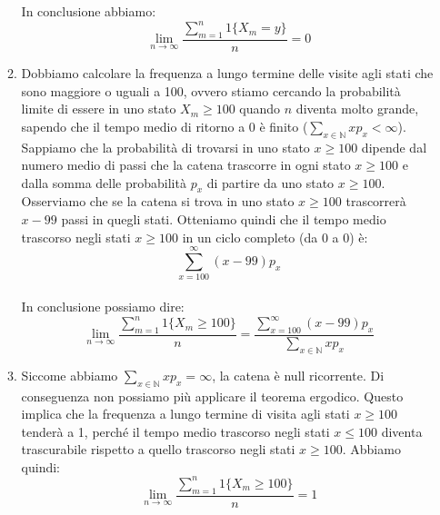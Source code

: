 \documentclass[a4paper,12pt]{article}
\begin{document}
\begin{itemize}
\begin{enumerate}[label=\alph*)]
			In conclusione abbiamo:\\
			\[
			\lim_{n \to \infty} \frac{\sum_{m=1}^n 1\{X_m = y\}}{n} = 0
			\]
			\item Dobbiamo calcolare la frequenza a lungo termine delle visite agli stati che sono maggiore o uguali a 100, ovvero stiamo cercando la probabilità limite di essere in uno stato $X_m \geq 100$
			quando $n$ diventa molto grande, sapendo che il tempo medio di ritorno a 0 è finito (\( \sum_{x \in \mathbb{N}} x p_x < \infty \)).\\
			Sappiamo che la probabilità di trovarsi in uno stato $x \geq 100$ dipende dal numero medio di passi che la catena trascorre in ogni stato $x \geq 100$ e dalla somma delle probabilità $p_x$ di partire da uno stato $x \geq 100$. Osserviamo che se la catena si trova in uno stato $x \geq 100$ trascorrerà $x-99$ passi in quegli stati. Otteniamo quindi che il tempo medio trascorso negli stati $x \geq 100$ in un ciclo completo (da 0 a 0) è:\\
			\[
			\sum_{x=100}^{\infty} (x - 99) p_x
			\]\\
			In conclusione possiamo dire:\\
			\[
			\lim_{n \to \infty} \frac{\sum_{m=1}^n 1\{X_m \geq 100\}}{n} = \frac{\sum_{x=100}^{\infty} (x - 99) p_x}{\sum_{x \in \mathbb{N}} x p_x}
			\]
			\item Siccome abbiamo \( \sum_{x \in \mathbb{N}} x p_x = \infty \), la catena è null ricorrente. Di conseguenza non possiamo più applicare il teorema ergodico. Questo implica che la frequenza a lungo termine di visita agli stati $x \geq 100$ tenderà a 1, perché il tempo medio trascorso negli stati $x \leq 100$ diventa trascurabile rispetto a quello trascorso negli stati $x \geq 100$. Abbiamo quindi:\\
			 \[
			 \lim_{n \to \infty} \frac{\sum_{m=1}^n 1\{X_m \geq 100\}}{n} = 1
			 \]
			
			
			
		\end{enumerate}
	
	\end{itemize}
	
\end{document}
